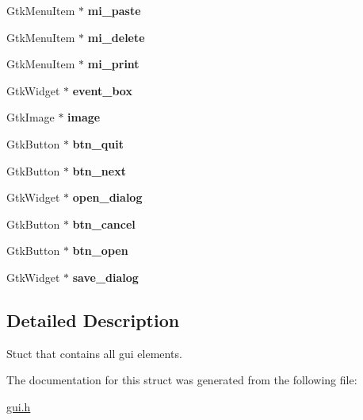 \begin{DoxyCompactItemize}
Gtk\+Menu\+Item $\ast$ {\bfseries mi\+\_\+paste}
\item 
\mbox{\label{structgui__elements_a51b89a46f586bbebb1282e65f5831d85}} 
Gtk\+Menu\+Item $\ast$ {\bfseries mi\+\_\+delete}
\item 
\mbox{\label{structgui__elements_a6e3c7c61348bfdf9d15c6c24eaf1f1e5}} 
Gtk\+Menu\+Item $\ast$ {\bfseries mi\+\_\+print}
\item 
\mbox{\label{structgui__elements_a02356773505a874d69da6085467b2329}} 
Gtk\+Widget $\ast$ {\bfseries event\+\_\+box}
\item 
\mbox{\label{structgui__elements_a5bff71a6e8530a1787880bb3ba16b85f}} 
Gtk\+Image $\ast$ {\bfseries image}
\item 
\mbox{\label{structgui__elements_ab47cb81f4d5d9bca89c6d392ac71f55b}} 
Gtk\+Button $\ast$ {\bfseries btn\+\_\+quit}
\item 
\mbox{\label{structgui__elements_adab64da2ed35678c9839394a130241b1}} 
Gtk\+Button $\ast$ {\bfseries btn\+\_\+next}
\item 
\mbox{\label{structgui__elements_a2de74af15b520d9c6f56c615fc67ae52}} 
Gtk\+Widget $\ast$ {\bfseries open\+\_\+dialog}
\item 
\mbox{\label{structgui__elements_a50fee9d6c938d52bf507650391f79e83}} 
Gtk\+Button $\ast$ {\bfseries btn\+\_\+cancel}
\item 
\mbox{\label{structgui__elements_a7243636824dd7e8b6ef21d3f8ff80501}} 
Gtk\+Button $\ast$ {\bfseries btn\+\_\+open}
\item 
\mbox{\label{structgui__elements_aa09e691708c38eb422df7d9f0e1b66b4}} 
Gtk\+Widget $\ast$ {\bfseries save\+\_\+dialog}
\end{DoxyCompactItemize}


\subsection{Detailed Description}
Stuct that contains all gui elements. 

The documentation for this struct was generated from the following file\+:\begin{DoxyCompactItemize}
\item 
\hyperlink{gui_8h}{gui.\+h}\end{DoxyCompactItemize}
